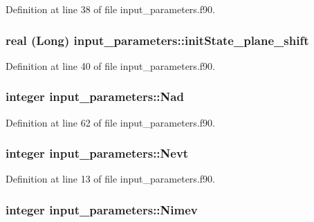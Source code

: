 Definition at line 38 of file input\_\-parameters.f90.

\hypertarget{namespaceinput__parameters_a97253a3c66d919b8a99dd33c633d3bd8}{
\subsubsection[{initState\_\-plane\_\-shift}]{\setlength{\rightskip}{0pt plus 5cm}real (Long) {\bf input\_\-parameters::initState\_\-plane\_\-shift}}}
\label{namespaceinput__parameters_a97253a3c66d919b8a99dd33c633d3bd8}


Definition at line 40 of file input\_\-parameters.f90.

\hypertarget{namespaceinput__parameters_a6e8306262594749651ff9230cb525363}{
\subsubsection[{Nad}]{\setlength{\rightskip}{0pt plus 5cm}integer {\bf input\_\-parameters::Nad}}}
\label{namespaceinput__parameters_a6e8306262594749651ff9230cb525363}


Definition at line 62 of file input\_\-parameters.f90.

\hypertarget{namespaceinput__parameters_a3db2ebb8fcd24f403d0c3bd05a38e4c2}{
\subsubsection[{Nevt}]{\setlength{\rightskip}{0pt plus 5cm}integer {\bf input\_\-parameters::Nevt}}}
\label{namespaceinput__parameters_a3db2ebb8fcd24f403d0c3bd05a38e4c2}


Definition at line 13 of file input\_\-parameters.f90.

\hypertarget{namespaceinput__parameters_ac0212885e38ab22a77411b20bec16420}{
\subsubsection[{Nimev}]{\setlength{\rightskip}{0pt plus 5cm}integer {\bf input\_\-parameters::Nimev}}}
\label{namespaceinput__parameters_ac0212885e38ab22a77411b20bec16420}


